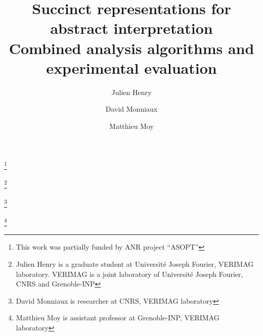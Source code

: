 \documentclass[a4paper]{amsart}
\begin{document}
\title[Succinct representations for abstract interpretation]{Succinct representations for abstract interpretation \\Combined analysis algorithms and experimental evaluation}
\thanks{ This work was partially funded by ANR project ``ASOPT''}

\author{Julien Henry}
\address{J. Henry\\VERIMAG\\2 av de Vignate\\38610 Gières\\France}
\thanks{Julien Henry is a graduate student at Université Joseph Fourier, VERIMAG laboratory. VERIMAG is a joint laboratory of Université Joseph Fourier, CNRS and Grenoble-INP}

\author{David Monniaux}
\address{D. Monniaux\\VERIMAG\\2 av de Vignate\\38610 Gières\\France}
\thanks{David Monniaux is researcher at CNRS, VERIMAG laboratory}

\author{Matthieu Moy}
\address{M. Moy\\VERIMAG\\2 av de Vignate\\38610 Gières\\France}
\thanks{Matthieu Moy is assistant professor at Grenoble-INP, VERIMAG laboratory}


\begin{abstract}

\end{abstract}

\maketitle



\FloatBarrier



\end{document}
